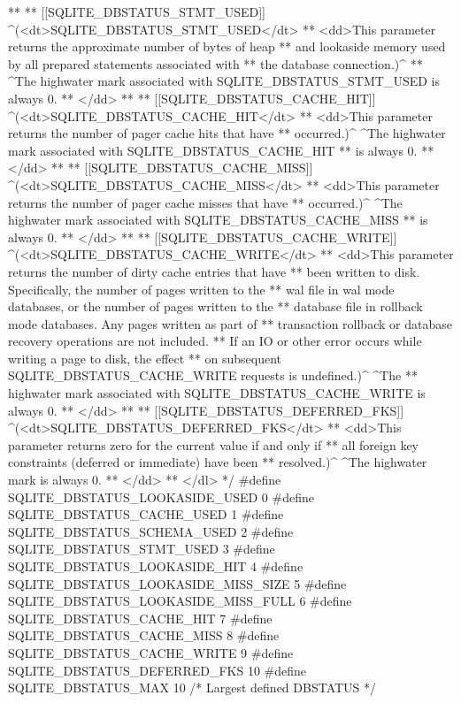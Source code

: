 \begin{Codex}[label=sqlite3.h,numbers=left]
{**
** [[SQLITE_DBSTATUS_STMT_USED]] ^(<dt>SQLITE_DBSTATUS_STMT_USED</dt>
** <dd>This parameter returns the approximate number of bytes of heap
** and lookaside memory used by all prepared statements associated with
** the database connection.)^
** ^The highwater mark associated with SQLITE_DBSTATUS_STMT_USED is always 0.
** </dd>
**
** [[SQLITE_DBSTATUS_CACHE_HIT]] ^(<dt>SQLITE_DBSTATUS_CACHE_HIT</dt>
** <dd>This parameter returns the number of pager cache hits that have
** occurred.)^ ^The highwater mark associated with SQLITE_DBSTATUS_CACHE_HIT 
** is always 0.
** </dd>
**
** [[SQLITE_DBSTATUS_CACHE_MISS]] ^(<dt>SQLITE_DBSTATUS_CACHE_MISS</dt>
** <dd>This parameter returns the number of pager cache misses that have
** occurred.)^ ^The highwater mark associated with SQLITE_DBSTATUS_CACHE_MISS 
** is always 0.
** </dd>
**
** [[SQLITE_DBSTATUS_CACHE_WRITE]] ^(<dt>SQLITE_DBSTATUS_CACHE_WRITE</dt>
** <dd>This parameter returns the number of dirty cache entries that have
** been written to disk. Specifically, the number of pages written to the
** wal file in wal mode databases, or the number of pages written to the
** database file in rollback mode databases. Any pages written as part of
** transaction rollback or database recovery operations are not included.
** If an IO or other error occurs while writing a page to disk, the effect
** on subsequent SQLITE_DBSTATUS_CACHE_WRITE requests is undefined.)^ ^The
** highwater mark associated with SQLITE_DBSTATUS_CACHE_WRITE is always 0.
** </dd>
**
** [[SQLITE_DBSTATUS_DEFERRED_FKS]] ^(<dt>SQLITE_DBSTATUS_DEFERRED_FKS</dt>
** <dd>This parameter returns zero for the current value if and only if
** all foreign key constraints (deferred or immediate) have been
** resolved.)^  ^The highwater mark is always 0.
** </dd>
** </dl>
*/
#define SQLITE_DBSTATUS_LOOKASIDE_USED       0
#define SQLITE_DBSTATUS_CACHE_USED           1
#define SQLITE_DBSTATUS_SCHEMA_USED          2
#define SQLITE_DBSTATUS_STMT_USED            3
#define SQLITE_DBSTATUS_LOOKASIDE_HIT        4
#define SQLITE_DBSTATUS_LOOKASIDE_MISS_SIZE  5
#define SQLITE_DBSTATUS_LOOKASIDE_MISS_FULL  6
#define SQLITE_DBSTATUS_CACHE_HIT            7
#define SQLITE_DBSTATUS_CACHE_MISS           8
#define SQLITE_DBSTATUS_CACHE_WRITE          9
#define SQLITE_DBSTATUS_DEFERRED_FKS        10
#define SQLITE_DBSTATUS_MAX                 10   /* Largest defined DBSTATUS */


}
\end{Codex}
